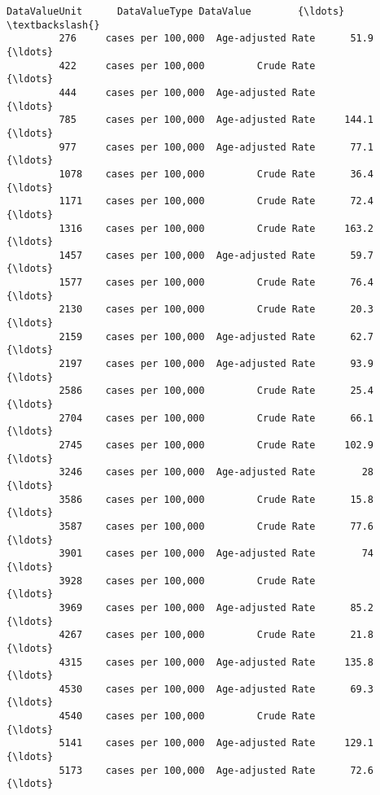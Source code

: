 \documentclass[11pt]{article}
\begin{document}
\begin{Verbatim}[commandchars=\\\{\}]
                     DataValueUnit      DataValueType DataValue        {\ldots}         \textbackslash{}
         276     cases per 100,000  Age-adjusted Rate      51.9        {\ldots}          
         422     cases per 100,000         Crude Rate                  {\ldots}          
         444     cases per 100,000  Age-adjusted Rate                  {\ldots}          
         785     cases per 100,000  Age-adjusted Rate     144.1        {\ldots}          
         977     cases per 100,000  Age-adjusted Rate      77.1        {\ldots}          
         1078    cases per 100,000         Crude Rate      36.4        {\ldots}          
         1171    cases per 100,000         Crude Rate      72.4        {\ldots}          
         1316    cases per 100,000         Crude Rate     163.2        {\ldots}          
         1457    cases per 100,000  Age-adjusted Rate      59.7        {\ldots}          
         1577    cases per 100,000         Crude Rate      76.4        {\ldots}          
         2130    cases per 100,000         Crude Rate      20.3        {\ldots}          
         2159    cases per 100,000  Age-adjusted Rate      62.7        {\ldots}          
         2197    cases per 100,000  Age-adjusted Rate      93.9        {\ldots}          
         2586    cases per 100,000         Crude Rate      25.4        {\ldots}          
         2704    cases per 100,000         Crude Rate      66.1        {\ldots}          
         2745    cases per 100,000         Crude Rate     102.9        {\ldots}          
         3246    cases per 100,000  Age-adjusted Rate        28        {\ldots}          
         3586    cases per 100,000         Crude Rate      15.8        {\ldots}          
         3587    cases per 100,000         Crude Rate      77.6        {\ldots}          
         3901    cases per 100,000  Age-adjusted Rate        74        {\ldots}          
         3928    cases per 100,000         Crude Rate                  {\ldots}          
         3969    cases per 100,000  Age-adjusted Rate      85.2        {\ldots}          
         4267    cases per 100,000         Crude Rate      21.8        {\ldots}          
         4315    cases per 100,000  Age-adjusted Rate     135.8        {\ldots}          
         4530    cases per 100,000  Age-adjusted Rate      69.3        {\ldots}          
         4540    cases per 100,000         Crude Rate                  {\ldots}          
         5141    cases per 100,000  Age-adjusted Rate     129.1        {\ldots}          
         5173    cases per 100,000  Age-adjusted Rate      72.6        {\ldots}          

\end{Verbatim}
\end{document}
